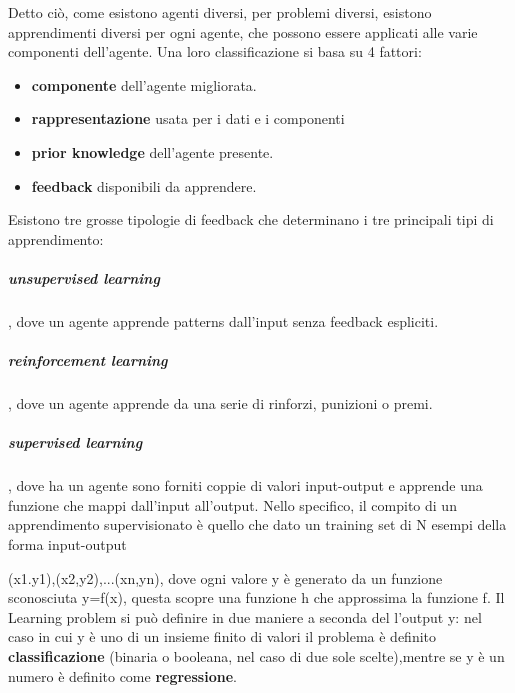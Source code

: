 \documentclass[14pt]{extarticle}
\begin{document}
Detto ciò, come esistono agenti diversi, per problemi diversi, esistono apprendimenti diversi per ogni agente, che possono essere applicati alle varie componenti dell'agente.
Una loro classificazione si basa su 4 fattori:
\begin{itemize}
\item \textbf{componente} dell'agente migliorata.
\item \textbf{rappresentazione} usata per i dati e i componenti
\item \textbf{prior knowledge} dell'agente presente.
\item \textbf{feedback}  disponibili da apprendere. 
\end{itemize} 

Esistono tre grosse tipologie di feedback che determinano i tre principali tipi di apprendimento:
\subparagraph{unsupervised learning}, dove un agente apprende patterns dall'input senza feedback espliciti. 

\subparagraph{reinforcement learning}, dove un agente apprende da una serie di rinforzi, punizioni o premi.
\subparagraph{supervised learning}, dove ha un agente sono forniti coppie di valori input-output e apprende una funzione che mappi dall'input all'output. 
Nello specifico, il compito di un apprendimento supervisionato è quello che dato un training set di N esempi della forma input-output

(x1.y1),(x2,y2),...(xn,yn),
dove ogni valore y è generato da un funzione sconosciuta y=f(x), questa scopre una funzione h che approssima la funzione f.  
Il Learning problem si può definire in due maniere a seconda del l'output y: nel caso in cui  y è uno di  un insieme finito di valori il problema è definito  \textbf{classificazione} (binaria o booleana, nel caso di due sole scelte),mentre se y è un numero
 è definito come \textbf{regressione}.
 
\end{document}
